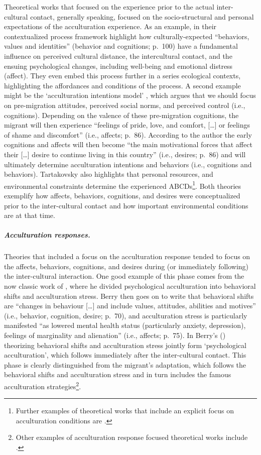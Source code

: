 Theoretical works that focused on the experience prior to the actual
inter-cultural contact, generally speaking, focused on the
socio-structural and personal expectations of the acculturation
experience. As an example, \citet[][]{Ward2016} in their contextualized
process framework highlight how culturally-expected ``behaviors, values
and identities'' (behavior and cognitions; p.~100) have a fundamental
influence on perceived cultural distance, the intercultural contact, and
the ensuing psychological changes, including well-being and emotional
distress (affect). They even embed this process further in a series
ecological contexts, highlighting the affordances and conditions of the
process. A second example might be the `acculturation intentions model'
\citep[][]{Tartakovsky2012}, which argues that we should focus on
pre-migration attitudes, perceived social norms, and perceived control
(i.e., cognitions). Depending on the valence of these pre-migration
cognitions, the migrant will then experience ``feelings of pride, love,
and comfort, {[}\ldots{]} or feelings of shame and discomfort'' (i.e.,
affects; p.~86). According to the author the early cognitions and
affects will then become ``the main motivational forces that affect
their {[}\ldots{]} desire to continue living in this country'' (i.e.,
desires; p.~86) and will ultimately determine acculturation intentions
and behaviors (i.e., cognitions and behaviors). Tartakovsky also
highlights that personal resources, and environmental constraints
determine the experienced
ABCDs\footnote{Further examples of theoretical works that include an explicit focus on acculturation conditions are \citet[][]{Kim1988, Rogler1994, Navas2005, Giles1977, Robinson2019, Serdarevic2005}.}.
Both theories exemplify how affects, behaviors, cognitions, and desires
were conceptualized prior to the inter-cultural contact and how
important environmental conditions are at that time.

\subparagraph{Acculturation responses.}

Theories that included a focus on the acculturation response tended to
focus on the affects, behaviors, cognitions, and desires during (or
immediately following) the inter-cultural interaction. One good example
of this phase comes from the now classic work of \citet[][]{Berry1992},
where he divided psychological acculturation into behavioral shifts and
acculturation stress. Berry then goes on to write that behavioral shifts
are ``changes in behaviour {[}\ldots{]} and include values, attitudes,
abilities and motives'' (i.e., behavior, cognition, desire; p.~70), and
acculturation stress is particularly manifested ``as lowered mental
health status (particularly anxiety, depression), feelings of
marginality and alienation'' (i.e., affects; p.~75). In Berry's
(\citeyear{Berry1992}) theorizing behavioral shifts and acculturation
stress jointly form `psychological acculturation', which follows
immediately after the inter-cultural contact. This phase is clearly
distinguished from the migrant's adaptation, which follows the
behavioral shifts and acculturation stress and in turn includes the
famous acculturation
strategies\footnote{Other examples of acculturation response focused theoretical works include \citet[][]{Berry2005, Sam2003, Riedel2011, Ward2016}.}.

